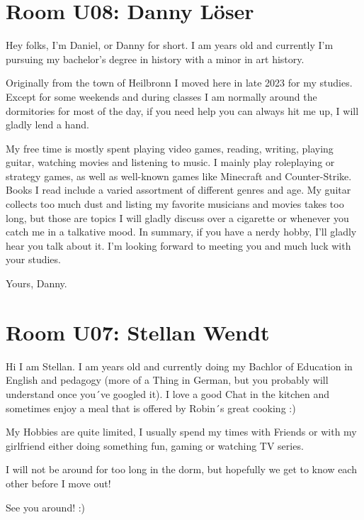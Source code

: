 \section{Room U08: Danny Löser} \label{sec:dannyL}
%
\FPsub\result{\theCurrentDate}{\theBirthdate}
\FPdiv{}
\FPtrunc{}

Hey folks, I’m Daniel, or Danny for short. I am \myage{} years old and currently I'm pursuing my bachelor’s degree in history with a minor in art history.

Originally from the town of Heilbronn I moved here in late 2023 for my studies. Except for some weekends and during classes I am normally around the dormitories for most of the day, if you need help you can always hit me up, I will gladly lend a hand.

My free time is mostly spent playing video games, reading, writing, playing guitar, watching movies and listening to music. I mainly play roleplaying or strategy games, as well as well-known games like Minecraft and Counter-Strike. Books I read include a varied assortment of different genres and age. My guitar collects too much dust and listing my favorite musicians and movies takes too long, but those are topics I will gladly discuss over a cigarette or whenever you catch me in a talkative mood. In summary, if you have a nerdy hobby, I’ll gladly hear you talk about it. I’m looking forward to meeting you and much luck with your studies.

Yours, Danny.

\section{Room U07: Stellan Wendt} \label{sec:stellanW}
%
\FPsub\result{\theCurrentDate}{\theBirthdate}
\FPdiv{}
\FPtrunc{}

Hi I am Stellan. I am \myage{} years old and currently doing my Bachlor of Education in English and pedagogy (more of a Thing in German, but you probably will understand once you´ve googled it). I love a good Chat in the kitchen and sometimes enjoy a meal that is offered by Robin´s great cooking :)

My Hobbies are quite limited, I usually spend my times with Friends or with my girlfriend either doing something fun, gaming or watching TV series.

I will not be around for too long in the dorm, but hopefully we get to know each other before I move out!

See you around! :)